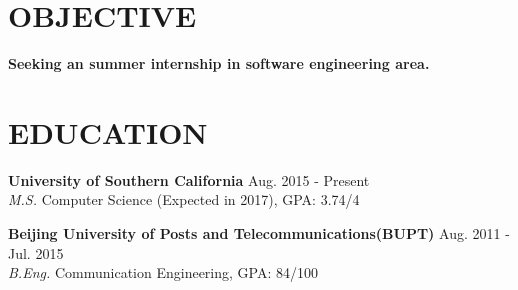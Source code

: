 \documentclass[margin,10pt]{res} %
\begin{document}
\begin{resume}


\section{OBJECTIVE}
{\bf Seeking an summer internship in software engineering area.}





\section{EDUCATION}

{\bf University of Southern California} \hfill Aug. 2015 - Present \\
{\sl M.S.} Computer Science (Expected in 2017), GPA: 3.74/4

{\bf Beijing University of Posts and Telecommunications(BUPT)} \hfill Aug. 2011 - Jul. 2015\\
{\sl B.Eng.} Communication Engineering, GPA: 84/100



\end{resume}
\end{document}
